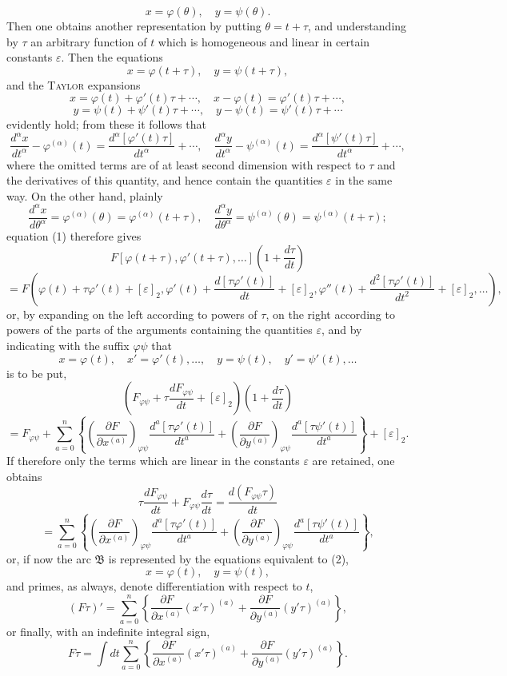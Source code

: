 \documentclass[11pt,a4paper,leqno]{article}
\begin{document}
\begin{equation}\tag{2}
x=\varphi(\theta),\quad y=\psi(\theta).
\end{equation}
Then one obtains another representation by putting $\theta=t+\tau$, and understanding by $\tau$ an arbitrary function of $t$ which is homogeneous and linear in certain constants $\varepsilon$. Then the equations
\[
x=\varphi(t+\tau),\quad y=\psi(t+\tau),
\]
and the \textsc{Taylor} expansions
\[
x=\varphi(t)+\varphi'(t)\tau+\cdots,
\quad x-\varphi(t)=\varphi'(t)\tau+\cdots,
\]
\[
y=\psi(t)+\psi'(t)\tau+\cdots,
\quad y-\psi(t)=\psi'(t)\tau+\cdots
\]
evidently hold; from these it follows that
\[
\frac{d^\alpha x}{dt^\alpha}-\varphi^{(\alpha)}(t)
=\frac{d^\alpha[\varphi'(t)\tau]}{dt^\alpha}+\cdots,
\quad
\frac{d^\alpha y}{dt^\alpha}-\psi^{(\alpha)}(t)
=\frac{d^\alpha[\psi'(t)\tau]}{dt^\alpha}+\cdots,
\]
where the omitted terms are of at least second dimension with respect to $\tau$ and the derivatives of this quantity,
and hence contain the quantities $\varepsilon$ in the same way. On the other hand, plainly
\[
\frac{d^\alpha x}{d\theta^\alpha}=\varphi^{(\alpha)}(\theta)=\varphi^{(\alpha)}(t+\tau),
\quad
\frac{d^\alpha y}{d\theta^\alpha}=\psi^{(\alpha)}(\theta)=\psi^{(\alpha)}(t+\tau);
\]
equation (1) therefore gives
\[
F[\varphi(t+\tau),\varphi'(t+\tau),\ldots]\left(1+\frac{d\tau}{dt}\right)
\]
\[
=F\left(\varphi(t)+\tau\varphi'(t)+[\varepsilon]_2,
\varphi'(t)+\frac{d[\tau\varphi'(t)]}{dt}+[\varepsilon]_2,
\varphi''(t)+\frac{d^2[\tau\varphi'(t)]}{dt^2}+[\varepsilon]_2,\ldots\right),
\]
or, by expanding on the left according to powers of $\tau$, on the right according to powers of the parts of the arguments containing the quantities $\varepsilon$, and by indicating with the suffix $\varphi\psi$ that
\[
x=\varphi(t),\quad x'=\varphi'(t),\ldots,
\quad y=\psi(t),\quad y'=\psi'(t),\ldots
\]
is to be put,
\[
\left(F_{\varphi\psi}+\tau\frac{dF_{\varphi\psi}}{dt}+[\varepsilon]_2\right)\left(1+\frac{d\tau}{dt}\right)
\]
\[
=F_{\varphi\psi}+\sum_{a=0}^n\left\{\left(\frac{\partial F}{\partial x^{(a)}}\right)_{\varphi\psi}\frac{d^a[\tau\varphi'(t)]}{dt^a}
+\left(\frac{\partial F}{\partial y^{(a)}}\right)_{\varphi\psi}\frac{d^a[\tau\psi'(t)]}{dt^a}\right\}+[\varepsilon]_2.
\]
If therefore only the terms which are linear in the constants $\varepsilon$ are retained, one obtains
\[
\tau\frac{dF_{\varphi\psi}}{dt}+F_{\varphi\psi}\frac{d\tau}{dt}
=\frac{d(F_{\varphi\psi}\tau)}{dt}
\]
\[
=\sum_{a=0}^n\left\{\left(\frac{\partial F}{\partial x^{(a)}}\right)_{\varphi\psi}\frac{d^a[\tau\varphi'(t)]}{dt^a}
+\left(\frac{\partial F}{\partial y^{(a)}}\right)_{\varphi\psi}\frac{d^a[\tau\psi'(t)]}{dt^a}\right\},
\]
or, if now the arc $\mathfrak B$ is represented by the equations equivalent to (2),
\[
x=\varphi(t),\quad y=\psi(t),
\]
and primes, as always, denote differentiation with respect to $t$,
\[
(F\tau)'=\sum_{a=0}^n\left\{\frac{\partial F}{\partial x^{(a)}}(x'\tau)^{(a)}+\frac{\partial F}{\partial y^{(a)}}(y'\tau)^{(a)}\right\},
\]
or finally, with an indefinite integral sign,
\begin{equation}\tag{3}
F\tau=\int dt\sum_{a=0}^n\left\{\frac{\partial F}{\partial x^{(a)}}(x'\tau)^{(a)}+\frac{\partial F}{\partial y^{(a)}}(y'\tau)^{(a)}\right\}.
\end{equation}
\end{document}
